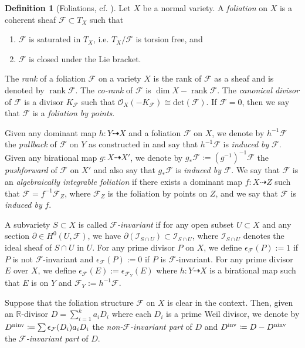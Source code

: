 \documentclass[12pt]{amsart}
\numberwithin{equation}{section}
\newcommand{\rk}{\operatorname{rank}}
\newcommand{\Ff}{\mathcal{F}}
\theoremstyle{definition}
\newtheorem{defn}[thm]{Definition}
\theoremstyle{definition}
\theoremstyle{definition}
\begin{document}
\begin{defn}[Foliations, {cf. \cite{ACSS21,CS21}}]\label{defn: foliation}
Let $X$ be a normal variety. A \emph{foliation} on $X$ is a coherent sheaf $\Ff\subset T_X$ such that
\begin{enumerate}
    \item $\Ff$ is saturated in $T_X$, i.e. $T_X/\Ff$ is torsion free, and
    \item $\Ff$ is closed under the Lie bracket.
\end{enumerate}

The \emph{rank} of a foliation $\Ff$ on a variety $X$ is the rank of $\Ff$ as a sheaf and is denoted by $\rk\Ff$. 
The \emph{co-rank} of $\Ff$ is $\dim X-\rk\Ff$. The \emph{canonical divisor} of $\Ff$ is a divisor $K_\Ff$ such that $\mathcal{O}_X(-K_{\mathcal{F}})\cong\mathrm{det}(\Ff)$. If $\Ff=0$, then we say that $\Ff$ is a \emph{foliation by points}.

Given any dominant map 
$h: Y\dashrightarrow X$ and a foliation $\mathcal F$ on $X$, we denote by $h^{-1}\Ff$ the \emph{pullback} of $\Ff$ on $Y$ as constructed in \cite[3.2]{Dru21} and say that $h^{-1}\Ff$ is \emph{induced by} $\Ff$. Given any birational map $g: X\dashrightarrow X'$, we denote by $g_\ast \Ff:=(g^{-1})^{-1}\Ff$ the \emph{pushforward} of $\Ff$ on $X'$ and also say that $g_\ast \Ff$ is \emph{induced by} $\Ff$. We say that $\Ff$ is an \emph{algebraically integrable foliation} if there exists a dominant map $f: X\dashrightarrow Z$ such that $\Ff=f^{-1}\Ff_Z$, where $\Ff_Z$ is the foliation by points on $Z$, and we say that $\Ff$ is \emph{induced by} $f$.

A subvariety $S\subset X$ is called \emph{$\Ff$-invariant} if for any open subset $U\subset X$ and any section $\partial\in H^0(U,\Ff)$, we have $\partial(\mathcal{I}_{S\cap U})\subset \mathcal{I}_{S\cap U}$,  where $\mathcal{I}_{S\cap U}$ denotes the ideal sheaf of $S\cap U$ in $U$.  
For any prime divisor $P$ on $X$, we define $\epsilon_{\Ff}(P):=1$ if $P$ is not $\Ff$-invariant and $\epsilon_{\Ff}(P):=0$ if $P$ is $\Ff$-invariant. For any prime divisor $E$ over $X$, we define $\epsilon_{\Ff}(E):=\epsilon_{\Ff_Y}(E)$ where $h: Y\dashrightarrow X$ is a birational map such that $E$ is on $Y$ and $\Ff_Y:=h^{-1}\Ff$.

Suppose that the foliation structure $\Ff$ on $X$ is clear in the context. Then, given an $\mathbb R$-divisor $D = \sum_{i = 1}^k a_iD_i$ where each $D_i$ is a prime Weil divisor,
we denote by $D^{{\rm ninv}} \coloneqq \sum \epsilon_{\mathcal F}(D_i)a_iD_i$ the \emph{non-$\Ff$-invariant part} of $D$ and $D^{{\rm inv}} \coloneqq D-D^{{\rm ninv}}$ the \emph{$\Ff$-invariant part} of $D$.



\end{defn}
\end{document}
